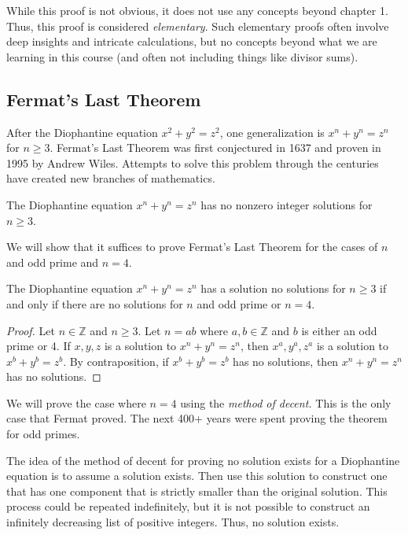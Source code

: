 \documentclass{ximera}
\begin{document}
While this proof is not obvious, it does not use any concepts beyond chapter 1. Thus, this proof is considered \emph{elementary}. Such elementary proofs often involve deep insights and intricate calculations, but no concepts beyond what we are learning in this course (and often not including things like divisor sums).

\subsection{Fermat's Last Theorem}
After the Diophantine equation $x^2+y^2=z^2$, one generalization is $x^n+y^n=z^n$ for $n\geq3$. Fermat's Last Theorem was first conjectured in 1637 and proven in 1995 by Andrew Wiles. Attempts to solve this problem through the centuries have created new branches of mathematics.

\begin{theorem}
The Diophantine equation $x^n+y^n=z^n$ has no nonzero integer solutions for $n\geq3$.
\end{theorem}

We will show that it suffices to prove Fermat's Last Theorem for the cases of $n$ and odd prime and $n=4$. 
\begin{theorem}
 The Diophantine equation $x^n+y^n=z^n$ has a solution no solutions for $n\geq 3$ if and only if there are no solutions for $n$ and odd prime or $n=4$.
\end{theorem}
\begin{proof}
 Let $n\in\mathbb{Z}$ and $n\geq 3$. Let $n=ab$ where $a,b\in\mathbb{Z}$ and $b$ is either an odd prime or 4. If $x,y,z$ is a solution to $x^n+y^n=z^n$, then $x^a,y^a,z^a$ is a solution to $x^b+y^b=z^b$. By contraposition, if $x^b+y^b=z^b$ has no solutions, then $x^n+y^n=z^n$ has no solutions.
\end{proof}

We will prove the case where $n=4$ using the \emph{method of decent.} This is the only case that Fermat proved. The next 400+ years were spent proving the theorem for odd primes. 

The idea of the method of decent for proving no solution exists for a Diophantine equation is to assume a solution exists. Then use this solution to construct one that has one component that is strictly smaller than the original solution. This process could be repeated indefinitely, but it is not possible to construct an infinitely decreasing list of positive integers. Thus, no solution exists.
\end{document}
